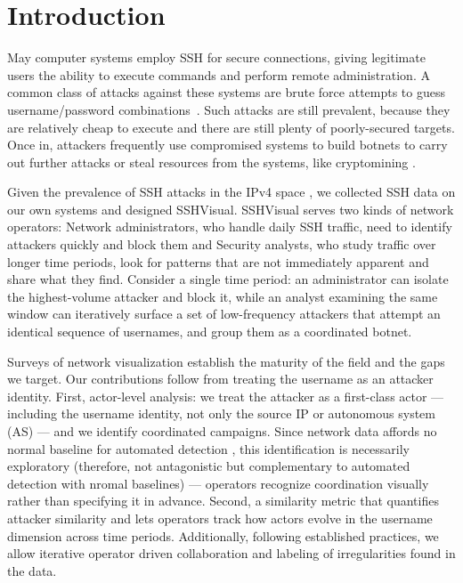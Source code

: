 \documentclass[10pt,twocolumn]{article}   %
\begin{document}
\section{Introduction}
May computer systems employ SSH \cite{ylonen1996ssh} for secure connections, giving legitimate users the ability to execute commands and perform remote 
administration.
A common class of attacks against these systems are brute force attempts to guess username/password combinations~\cite{295683}. Such attacks are still prevalent, because they are relatively cheap to execute and there are still plenty of poorly-secured targets.
Once in, attackers frequently use compromised
systems to build botnets \cite{295683} to carry out further attacks 
\cite{antonakakis2017understanding, kolias2017ddos} or steal resources from the systems, like cryptomining \cite{dang2019understanding, pastrana2019first}.

Given the prevalence of SSH attacks in the IPv4 space \cite{295683}, we collected SSH data on our own systems and designed SSHVisual. SSHVisual serves two kinds of 
network operators: Network administrators, who handle daily SSH traffic, need to identify attackers quickly and block them and Security analysts, who study traffic 
over longer time periods, look for patterns that are not immediately apparent and share what they find. Consider a single time period: an administrator can isolate 
the highest-volume attacker and block it, while an analyst examining the same window can iteratively surface a set of low-frequency attackers that 
attempt an identical sequence of usernames, and group them as a coordinated botnet.

Surveys of network visualization \cite{7166305, 6007132, zhang2017survey, raynor2022state, wu2018research} establish the maturity of the field and the gaps 
we target. Our contributions follow from treating the username as an attacker identity. First, actor-level analysis: we treat the attacker as a 
first-class actor — including the username identity, not only the source IP or autonomous system (AS) — and we identify coordinated campaigns. Since network data 
affords no normal baseline for automated detection \cite{gates2006challenging}, this identification is necessarily exploratory (therefore, not antagonistic but complementary to automated
detection with nromal baselines) — operators recognize coordination visually rather than specifying it in advance. Second, a similarity metric that 
quantifies attacker similarity and lets operators track how actors evolve in the username dimension across time periods. 
Additionally, following established practices, we allow iterative operator driven collaboration and labeling of irregularities found in the data.
\end{document}

